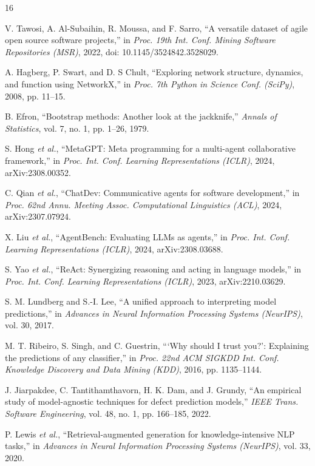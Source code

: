 \documentclass[conference]{IEEEtran}
\begin{document}

\begin{thebibliography}{16}

 V. Tawosi, A. Al-Subaihin, R. Moussa, and F. Sarro, ``A versatile
dataset of agile open source software projects,'' in \emph{Proc. 19th Int. Conf.
Mining Software Repositories (MSR)}, 2022, doi: 10.1145/3524842.3528029.

 A. Hagberg, P. Swart, and D. S Chult, ``Exploring network
structure, dynamics, and function using NetworkX,'' in \emph{Proc. 7th Python in
Science Conf. (SciPy)}, 2008, pp. 11--15.

 B. Efron, ``Bootstrap methods: Another look at the jackknife,''
\emph{Annals of Statistics}, vol. 7, no. 1, pp. 1--26, 1979.

 S. Hong \emph{et al.}, ``MetaGPT: Meta programming for a
multi-agent collaborative framework,'' in \emph{Proc. Int. Conf. Learning
Representations (ICLR)}, 2024, arXiv:2308.00352.

 C. Qian \emph{et al.}, ``ChatDev: Communicative agents for
software development,'' in \emph{Proc. 62nd Annu. Meeting Assoc. Computational
Linguistics (ACL)}, 2024, arXiv:2307.07924.

 X. Liu \emph{et al.}, ``AgentBench: Evaluating LLMs as
agents,'' in \emph{Proc. Int. Conf. Learning Representations (ICLR)}, 2024,
arXiv:2308.03688.

 S. Yao \emph{et al.}, ``ReAct: Synergizing reasoning and acting in
language models,'' in \emph{Proc. Int. Conf. Learning Representations (ICLR)},
2023, arXiv:2210.03629.

 S. M. Lundberg and S.-I. Lee, ``A unified approach to interpreting
model predictions,'' in \emph{Advances in Neural Information Processing Systems
(NeurIPS)}, vol. 30, 2017.

 M. T. Ribeiro, S. Singh, and C. Guestrin, ```Why should I trust
you?': Explaining the predictions of any classifier,'' in \emph{Proc. 22nd ACM
SIGKDD Int. Conf. Knowledge Discovery and Data Mining (KDD)}, 2016, pp.
1135--1144.

 J. Jiarpakdee, C. Tantithamthavorn, H. K. Dam, and J. Grundy,
``An empirical study of model-agnostic techniques for defect prediction models,''
\emph{IEEE Trans. Software Engineering}, vol. 48, no. 1, pp. 166--185, 2022.

 P. Lewis \emph{et al.}, ``Retrieval-augmented generation for
knowledge-intensive NLP tasks,'' in \emph{Advances in Neural Information
Processing Systems (NeurIPS)}, vol. 33, 2020.


\end{thebibliography}
\end{document}
